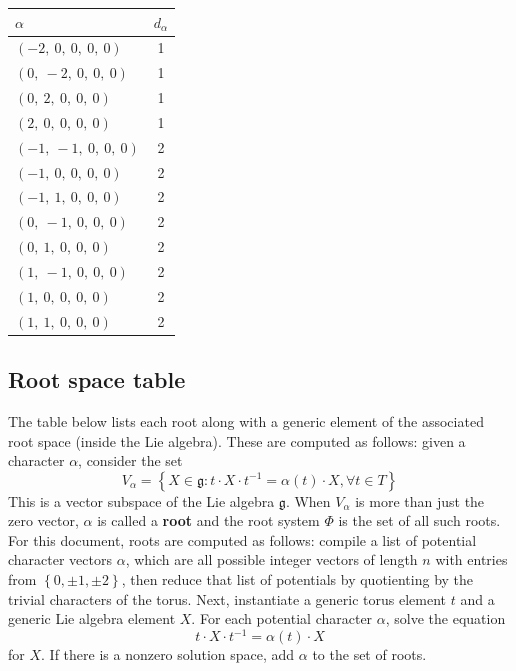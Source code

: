 \documentclass[11pt]{article}
\newcommand{\noi}{\noindent}
\newcommand{\tbf}{\textbf}
\newcommand{\inv}{^{-1}}
\newcommand{\lb}{\left\{}
\newcommand{\rb}{\right\}}
\newcommand{\frakg}{\mathfrak{g}}
\theoremstyle{definition}
\begin{document}
\noindent \begin{tabular}{|l|c|}
    \hline
    \textbf{$\alpha$} & \textbf{$d_{\alpha}$} \\
    \hline
    $\left( -2, \  0, \  0, \  0, \  0\right)$ & 1 \\
    \hline
    $\left( 0, \  -2, \  0, \  0, \  0\right)$ & 1 \\
    \hline
    $\left( 0, \  2, \  0, \  0, \  0\right)$ & 1 \\
    \hline
    $\left( 2, \  0, \  0, \  0, \  0\right)$ & 1 \\
    \hline
    $\left( -1, \  -1, \  0, \  0, \  0\right)$ & 2 \\
    \hline
    $\left( -1, \  0, \  0, \  0, \  0\right)$ & 2 \\
    \hline
    $\left( -1, \  1, \  0, \  0, \  0\right)$ & 2 \\
    \hline
    $\left( 0, \  -1, \  0, \  0, \  0\right)$ & 2 \\
    \hline
    $\left( 0, \  1, \  0, \  0, \  0\right)$ & 2 \\
    \hline
    $\left( 1, \  -1, \  0, \  0, \  0\right)$ & 2 \\
    \hline
    $\left( 1, \  0, \  0, \  0, \  0\right)$ & 2 \\
    \hline
    $\left( 1, \  1, \  0, \  0, \  0\right)$ & 2 \\
    \hline
\end{tabular}


\subsection{Root space table}

\noi The table below lists each root along with a generic element of the associated root space (inside the Lie algebra). These are computed as follows: given a character $\alpha$, consider the set
\[
	V_\alpha = \lb X \in \frakg : t \cdot X \cdot t \inv = \alpha(t) \cdot X, \forall t \in T \rb
\]
This is a vector subspace of the Lie algebra $\frakg$. When $V_\alpha$ is more than just the zero vector, $\alpha$ is called a \tbf{root} and the root system $\Phi$ is the set of all such roots. For this document, roots are computed as follows: compile a list of potential character vectors $\alpha$, which are all possible integer vectors of length $n$ with entries from $\lb 0, \pm 1, \pm 2 \rb$, then reduce that list of potentials by quotienting by the trivial characters of the torus. Next, instantiate a generic torus element $t$ and a generic Lie algebra element $X$. For each potential character $\alpha$, solve the equation
\[
	t \cdot X \cdot t \inv = \alpha(t) \cdot X
\]
for $X$. If there is a nonzero solution space, add $\alpha$ to the set of roots.
\end{document}
